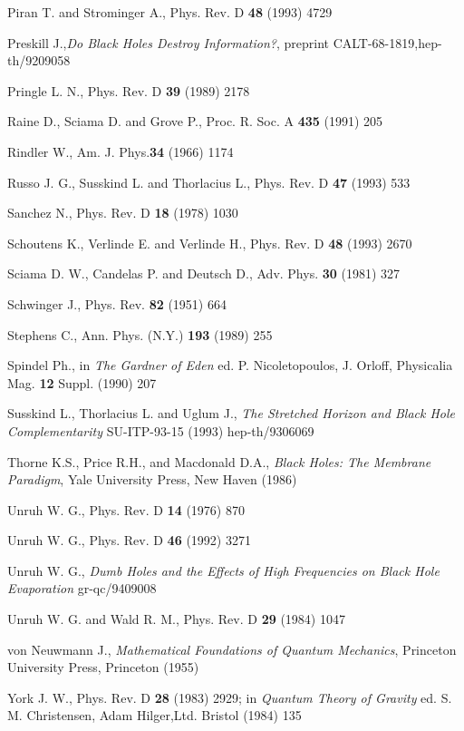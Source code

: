 \documentclass[12pt,oneside]{report}
\begin{document}
\begin{thebibliography}{999}
 Piran T. and Strominger A., Phys. Rev. D {\bf 48} (1993) 4729


 Preskill J.,{\em Do Black Holes Destroy Information?},
preprint CALT-68-1819,hep-th/9209058

 Pringle L. N., Phys. Rev. D {\bf 39} (1989) 2178

Raine D., Sciama D. and Grove P., Proc. R. Soc. A {\bf 435} (1991)
205

Rindler W., Am. J. Phys.{\bf  34} (1966) 1174

 Russo J. G., Susskind L. and Thorlacius L., Phys. Rev. D {\bf 47}
(1993) 533


 Sanchez N., Phys. Rev. D {\bf 18} (1978) 1030

 Schoutens K., Verlinde E. and Verlinde H., Phys. Rev. D {\bf 48}
(1993) 2670 


Sciama D. W., Candelas P. and Deutsch D., Adv. Phys. {\bf 30} (1981)
327

Schwinger J., Phys. Rev. {\bf 82} (1951) 664

Stephens C., Ann. Phys. (N.Y.) {\bf 193} (1989) 255

Spindel Ph., in {\em The Gardner of Eden} ed. P. Nicoletopoulos, J. Orloff,
 Physicalia Mag. {\bf 12} Suppl. (1990) 207 

 Susskind L., Thorlacius L. and Uglum J., {\em 
The Stretched Horizon and Black Hole Complementarity}
SU-ITP-93-15 (1993) hep-th/9306069 


Thorne K.S., Price R.H., and Macdonald D.A., {\em Black Holes: The
Membrane Paradigm}, Yale University Press, New Haven (1986)

Unruh W. G., Phys. Rev. D {\bf  14} (1976) 870

Unruh W. G., Phys. Rev. D {\bf 46} (1992) 3271

Unruh W. G.,{ \em  Dumb Holes and the Effects of High Frequencies on Black Hole Evaporation} gr-qc/9409008

Unruh W. G. and Wald R. M., Phys. Rev. D {\bf 29} (1984) 1047



von Neuwmann J., {\em Mathematical Foundations of Quantum
Mechanics}, Princeton University Press, Princeton (1955)

 York J. W., Phys. Rev. D {\bf 28} (1983) 2929;
in {\em Quantum Theory of Gravity} ed.  S. M. Christensen, Adam Hilger,Ltd. Bristol (1984)
135


\end{thebibliography}
\end{document}
